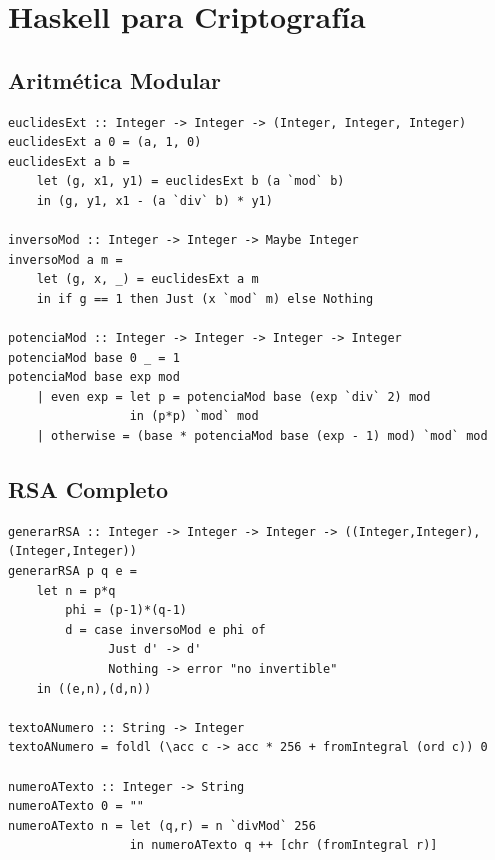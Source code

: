 \chapter{Haskell para Criptografía}

\section{Aritmética Modular}

\begin{lstlisting}[caption={Aritmética modular en Haskell}]
euclidesExt :: Integer -> Integer -> (Integer, Integer, Integer)
euclidesExt a 0 = (a, 1, 0)
euclidesExt a b =
    let (g, x1, y1) = euclidesExt b (a `mod` b)
    in (g, y1, x1 - (a `div` b) * y1)

inversoMod :: Integer -> Integer -> Maybe Integer
inversoMod a m =
    let (g, x, _) = euclidesExt a m
    in if g == 1 then Just (x `mod` m) else Nothing

potenciaMod :: Integer -> Integer -> Integer -> Integer
potenciaMod base 0 _ = 1
potenciaMod base exp mod
    | even exp = let p = potenciaMod base (exp `div` 2) mod
                 in (p*p) `mod` mod
    | otherwise = (base * potenciaMod base (exp - 1) mod) `mod` mod
\end{lstlisting}

\section{RSA Completo}

\begin{lstlisting}[caption={RSA en Haskell}]
generarRSA :: Integer -> Integer -> Integer -> ((Integer,Integer),(Integer,Integer))
generarRSA p q e =
    let n = p*q
        phi = (p-1)*(q-1)
        d = case inversoMod e phi of
              Just d' -> d'
              Nothing -> error "no invertible"
    in ((e,n),(d,n))

textoANumero :: String -> Integer
textoANumero = foldl (\acc c -> acc * 256 + fromIntegral (ord c)) 0

numeroATexto :: Integer -> String
numeroATexto 0 = ""
numeroATexto n = let (q,r) = n `divMod` 256
                 in numeroATexto q ++ [chr (fromIntegral r)]
\end{lstlisting}